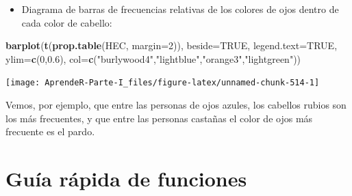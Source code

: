 \documentclass[]{book}
\newenvironment{Shaded}{\begin{snugshade}}{\end{snugshade}}
\newcommand{\DataTypeTok}[1]{\textcolor[rgb]{0.13,0.29,0.53}{#1}}
\newcommand{\DecValTok}[1]{\textcolor[rgb]{0.00,0.00,0.81}{#1}}
\newcommand{\FloatTok}[1]{\textcolor[rgb]{0.00,0.00,0.81}{#1}}
\newcommand{\KeywordTok}[1]{\textcolor[rgb]{0.13,0.29,0.53}{\textbf{#1}}}
\newcommand{\NormalTok}[1]{#1}
\newcommand{\OtherTok}[1]{\textcolor[rgb]{0.56,0.35,0.01}{#1}}
\newcommand{\StringTok}[1]{\textcolor[rgb]{0.31,0.60,0.02}{#1}}
\providecommand{\tightlist}{%
  \setlength{\itemsep}{0pt}\setlength{\parskip}{0pt}}
\theoremstyle{definition}
\theoremstyle{definition}
\theoremstyle{definition}
\theoremstyle{remark}
\begin{document}
\begin{itemize}
\tightlist
\item
  Diagrama de barras de frecuencias relativas de los colores de ojos dentro de cada color de cabello:
\end{itemize}

\begin{Shaded}
\begin{Highlighting}[]
\KeywordTok{barplot}\NormalTok{(}\KeywordTok{t}\NormalTok{(}\KeywordTok{prop.table}\NormalTok{(HEC, }\DataTypeTok{margin=}\DecValTok{2}\NormalTok{)), }\DataTypeTok{beside=}\OtherTok{TRUE}\NormalTok{,}
   \DataTypeTok{legend.text=}\OtherTok{TRUE}\NormalTok{, }\DataTypeTok{ylim=}\KeywordTok{c}\NormalTok{(}\DecValTok{0}\NormalTok{,}\FloatTok{0.6}\NormalTok{),}
   \DataTypeTok{col=}\KeywordTok{c}\NormalTok{(}\StringTok{"burlywood4"}\NormalTok{,}\StringTok{"lightblue"}\NormalTok{,}\StringTok{"orange3"}\NormalTok{,}\StringTok{"lightgreen"}\NormalTok{))}
\end{Highlighting}
\end{Shaded}

\begin{center}\texttt{[image: AprendeR-Parte-I\_files/figure-latex/unnamed-chunk-514-1]} \end{center}

Vemos, por ejemplo, que entre las personas de ojos azules, los cabellos rubios son los más frecuentes, y que entre las personas castañas el color de ojos más frecuente es el pardo.

\hypertarget{guia-rapida-de-funciones-4}{%
\section{Guía rápida de funciones}\label{guia-rapida-de-funciones-4}}
\end{document}
